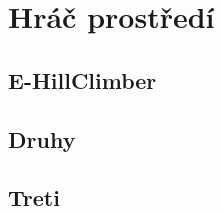 \section{Hráč prostředí}



\subsection{E-HillClimber}

\subsection{Druhy}

\subsection{Treti}

\endinput

